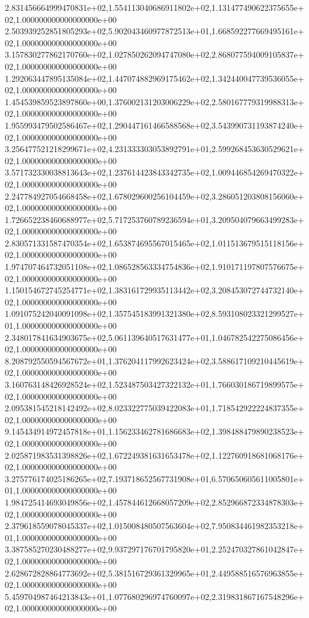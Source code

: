 2.831456664999470831e+02,1.554113040686911802e+02,1.131477490622375655e+02,1.000000000000000000e+00
2.503939252851805293e+02,5.902043460977872513e+01,1.668592277669495161e+02,1.000000000000000000e+00
3.157830277862170760e+02,1.027850262094747080e+02,2.868077594009105837e+02,1.000000000000000000e+00
1.292063447895135084e+02,1.447074882969175462e+02,1.342440047739536055e+02,1.000000000000000000e+00
1.454539859523897860e+00,1.376002131203006229e+02,2.580167779319988313e+02,1.000000000000000000e+00
1.955993479502586467e+02,1.290447161466588568e+02,3.543990731193874240e+02,1.000000000000000000e+00
3.256477521218299671e+02,4.231333303053892791e+01,2.599268453630529621e+02,1.000000000000000000e+00
3.571732330038813643e+02,1.237614423843342735e+02,1.009446854269470322e+02,1.000000000000000000e+00
2.247784927054668458e+02,1.678029600256104459e+02,3.286051203808156060e+02,1.000000000000000000e+00
1.726652238460688977e+02,5.717253760789236594e+01,3.209504079663499283e+02,1.000000000000000000e+00
2.830571331587470354e+02,1.653874695567015465e+02,1.011513679515118156e+02,1.000000000000000000e+00
1.974707464732051108e+02,1.086528563334754836e+02,1.910171197807576675e+02,1.000000000000000000e+00
1.150154672745254771e+02,1.383161729935113442e+02,3.208453072744732140e+02,1.000000000000000000e+00
1.091075242040091098e+02,1.357545183991321380e+02,8.593108023321299527e+01,1.000000000000000000e+00
2.348017841634903675e+02,5.061139640517631477e+01,1.046782542275086456e+02,1.000000000000000000e+00
8.208792550594567672e+01,1.376204117992623424e+02,3.588617109210445619e+02,1.000000000000000000e+00
3.160763148426928524e+02,1.523487503427322132e+01,1.766030186719899575e+02,1.000000000000000000e+00
2.095381545218142492e+02,8.023322775039422083e+01,1.718542922224837355e+02,1.000000000000000000e+00
9.145434914972457818e+01,1.156233462781686683e+02,1.398488479890238523e+02,1.000000000000000000e+00
2.025871983531398826e+02,1.672249381631653478e+02,1.122760918681068176e+02,1.000000000000000000e+00
3.275776174025186265e+02,7.193718652567731908e+01,6.570650605611005801e+01,1.000000000000000000e+00
1.984725414693049856e+02,1.457844612668057209e+02,2.852966872334878303e+02,1.000000000000000000e+00
2.379618559078045337e+02,1.015008480507563604e+02,7.950834461982353218e+01,1.000000000000000000e+00
3.387585270230488277e+02,9.937297176701795820e+01,2.252470327861042847e+02,1.000000000000000000e+00
2.628672828864773692e+02,5.381516729361329965e+01,2.449588516576963855e+02,1.000000000000000000e+00
5.459704987464213843e+01,1.077680296974760097e+02,2.319831867167548296e+02,1.000000000000000000e+00
